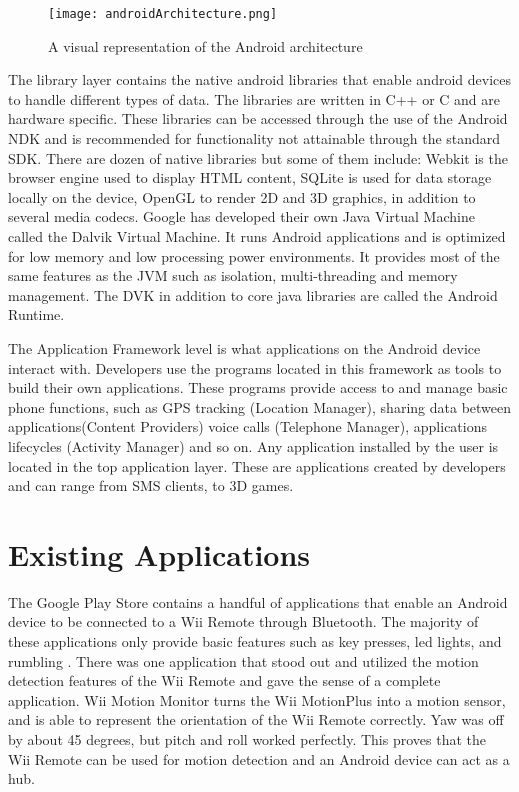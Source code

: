 \begin{figure}[!h]
  \centering
    \texttt{[image: androidArchitecture.png]}
    \caption{\footnotesize A visual representation of the Android architecture}
 \label{fig:androidArchitecture}
\end{figure}

The library layer contains the native android libraries that enable android devices to handle different types of data. The libraries are written in C++ or C and are hardware specific. These libraries can be accessed through the use of the Android NDK and is recommended for functionality not attainable through the standard SDK. There are dozen of native libraries but some of them include: Webkit is the browser engine used to display HTML content, SQLite is used for data storage locally on the device, OpenGL to render 2D and 3D graphics, in addition to several media codecs. Google has developed their own Java Virtual Machine called the Dalvik Virtual Machine. It runs Android applications and is optimized for low memory and low processing power environments. It provides most of the same features as the JVM such as isolation, multi-threading and memory management. The DVK in addition to core java libraries are called the Android Runtime.

The Application Framework level is what applications on the Android device interact with. Developers use the programs located in this framework as tools to build their own applications. These programs provide access to and manage basic phone functions, such as GPS tracking (Location Manager), sharing data between applications(Content Providers) voice calls (Telephone Manager), applications lifecycles (Activity Manager) and so on. Any application installed by the user is located in the top application layer. These are applications created by developers and can range from SMS clients, to 3D games.

\section{Existing Applications}
The Google Play Store contains a handful of applications that enable an Android device to be connected to a Wii Remote through Bluetooth. The majority of these applications only provide basic features such as key presses, led lights, and rumbling \cite{wiimoteController, simpleWiiController}. There was one application that stood out and utilized the motion detection features of the Wii Remote and gave the sense of a complete application. Wii Motion Monitor \cite{wiiMotionMonitor} turns the Wii MotionPlus into a motion sensor, and is able to represent the orientation of the Wii Remote correctly. Yaw was off by about 45 degrees, but pitch and roll worked perfectly. This proves that the Wii Remote can be used for motion detection and an Android device can act as a hub.

